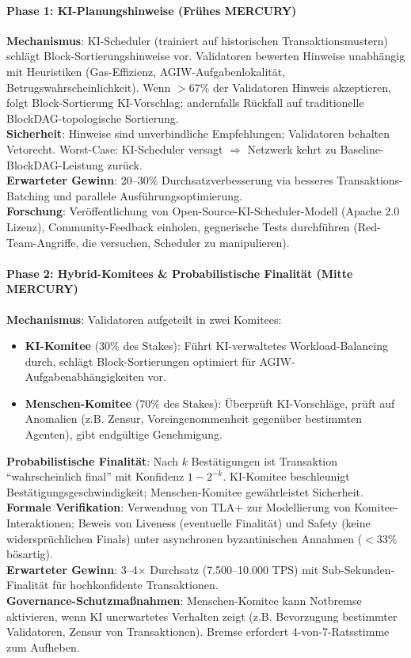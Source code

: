 \documentclass[11pt]{article}
\begin{document}
\paragraph{Phase 1: KI-Planungshinweise (Frühes MERCURY)}
\textbf{Mechanismus}: KI-Scheduler (trainiert auf historischen Transaktionsmustern) schlägt Block-Sortierungshinweise vor. Validatoren bewerten Hinweise unabhängig mit Heuristiken (Gas-Effizienz, AGIW-Aufgabenlokalität, Betrugswahrscheinlichkeit). Wenn $>67\%$ der Validatoren Hinweis akzeptieren, folgt Block-Sortierung KI-Vorschlag; andernfalls Rückfall auf traditionelle BlockDAG-topologische Sortierung.\\
\textbf{Sicherheit}: Hinweise sind unverbindliche Empfehlungen; Validatoren behalten Vetorecht. Worst-Case: KI-Scheduler versagt $\Rightarrow$ Netzwerk kehrt zu Baseline-BlockDAG-Leistung zurück.\\
\textbf{Erwarteter Gewinn}: 20--30\% Durchsatzverbesserung via besseres Transaktions-Batching und parallele Ausführungsoptimierung.\\
\textbf{Forschung}: Veröffentlichung von Open-Source-KI-Scheduler-Modell (Apache 2.0 Lizenz), Community-Feedback einholen, gegnerische Tests durchführen (Red-Team-Angriffe, die versuchen, Scheduler zu manipulieren).

\paragraph{Phase 2: Hybrid-Komitees \& Probabilistische Finalität (Mitte MERCURY)}
\textbf{Mechanismus}: Validatoren aufgeteilt in zwei Komitees:
\begin{itemize}[noitemsep]
  \item \textbf{KI-Komitee} (30\% des Stakes): Führt KI-verwaltetes Workload-Balancing durch, schlägt Block-Sortierungen optimiert für AGIW-Aufgabenabhängigkeiten vor.
  \item \textbf{Menschen-Komitee} (70\% des Stakes): Überprüft KI-Vorschläge, prüft auf Anomalien (z.B. Zensur, Voreingenommenheit gegenüber bestimmten Agenten), gibt endgültige Genehmigung.
\end{itemize}
\textbf{Probabilistische Finalität}: Nach $k$ Bestätigungen ist Transaktion ``wahrscheinlich final'' mit Konfidenz $1 - 2^{-k}$. KI-Komitee beschleunigt Bestätigungsgeschwindigkeit; Menschen-Komitee gewährleistet Sicherheit.\\
\textbf{Formale Verifikation}: Verwendung von TLA+ zur Modellierung von Komitee-Interaktionen; Beweis von Liveness (eventuelle Finalität) und Safety (keine widersprüchlichen Finals) unter asynchronen byzantinischen Annahmen ($<33\%$ bösartig).\\
\textbf{Erwarteter Gewinn}: 3--4$\times$ Durchsatz (7.500--10.000 TPS) mit Sub-Sekunden-Finalität für hochkonfidente Transaktionen.\\
\textbf{Governance-Schutzmaßnahmen}: Menschen-Komitee kann Notbremse aktivieren, wenn KI unerwartetes Verhalten zeigt (z.B. Bevorzugung bestimmter Validatoren, Zensur von Transaktionen). Bremse erfordert 4-von-7-Ratsstimme zum Aufheben.
\end{document}
